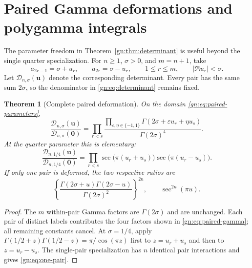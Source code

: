\documentclass[11pt,a4paper]{article}
\numberwithin{equation}{section}
\newtheorem{theorem}{Theorem}[section]
\theoremstyle{definition}
\theoremstyle{remark}
\begin{document}

\section{Paired Gamma deformations and polygamma integrals}
\label{gn:sec:paired}

The parameter freedom in Theorem~\ref{gn:thm:determinant} is useful
beyond the single quarter specialization.  For $n\ge1$, $\sigma>0$,
and $m=n+1$, take
\begin{equation}\label{gn:eq:paired-parameters}
 a_{2r-1}=\sigma+u_r,\qquad a_{2r}=\sigma-u_r,
 \qquad 1\le r\le m,\qquad |\Re u_r|<\sigma.
\end{equation}
Let $\mathcal D_{n,\sigma}(\mathbf u)$ denote the corresponding
determinant.  Every pair has the same sum $2\sigma$, so the denominator
in \eqref{gn:eq:determinant} remains fixed.

\begin{theorem}[Complete paired deformation]
\label{gn:thm:paired}
On the domain \eqref{gn:eq:paired-parameters},
\begin{equation}\label{gn:eq:paired-gamma}
 \boxed{\displaystyle
 \frac{\mathcal D_{n,\sigma}(\mathbf u)}
      {\mathcal D_{n,\sigma}(\mathbf0)}
 =\prod_{r<s}
   \frac{\displaystyle\prod_{\varepsilon,\eta\in\{-1,1\}}
          \Gamma(2\sigma+\varepsilon u_r+\eta u_s)}
        {\Gamma(2\sigma)^4}.}
\end{equation}
At the quarter parameter this is elementary:
\begin{equation}\label{gn:eq:paired-sec}
 \boxed{\displaystyle
 \frac{\mathcal D_{n,1/4}(\mathbf u)}
      {\mathcal D_{n,1/4}(\mathbf0)}
 =\prod_{r<s}\sec\bigl(\pi(u_r+u_s)\bigr)
                 \sec\bigl(\pi(u_r-u_s)\bigr).}
\end{equation}
If only one pair is deformed, the two respective ratios are
\begin{equation}\label{gn:eq:one-pair}
 \left\{\frac{\Gamma(2\sigma+u)\Gamma(2\sigma-u)}
                    {\Gamma(2\sigma)^2}\right\}^{2n},
 \qquad \sec^{2n}(\pi u).
\end{equation}
\end{theorem}

\begin{proof}
The $m$ within-pair Gamma factors are $\Gamma(2\sigma)$ and are
unchanged.  Each pair of distinct labels contributes the four factors
shown in \eqref{gn:eq:paired-gamma}; all remaining constants cancel.
At $\sigma=1/4$, apply
$\Gamma(1/2+z)\Gamma(1/2-z)=\pi/\cos(\pi z)$ first to
$z=u_r+u_s$ and then to $z=u_r-u_s$.  The single-pair specialization
has $n$ identical pair interactions and gives \eqref{gn:eq:one-pair}.
\end{proof}
\end{document}
